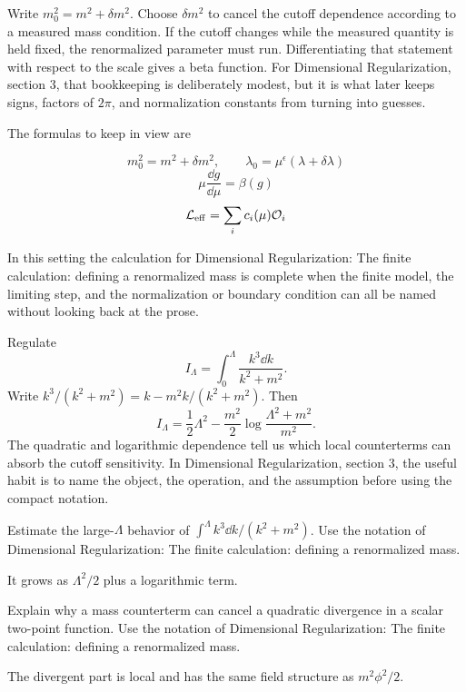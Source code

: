 Write \(m_0^2=m^2+\delta m^2\).  Choose \(\delta m^2\) to cancel the cutoff dependence according to a measured mass condition.  If the cutoff changes while the measured quantity is held fixed, the renormalized parameter must run.  Differentiating that statement with respect to the scale gives a beta function.  For Dimensional Regularization, section 3, that bookkeeping is deliberately modest, but it is what later keeps signs, factors of \(2\pi\), and normalization constants from turning into guesses.

The formulas to keep in view are

\[
  m_0^2=m^2+\delta m^2,\qquad \lambda_0=\mu^\epsilon(\lambda+\delta\lambda)
\]
\[
  \mu\frac{\dd g}{\dd\mu}=\beta(g)
\]
\[
  \mathcal L_{\mathrm{eff}}=\sum_i c_i(\mu)\mathcal O_i
\]

In this setting the calculation for Dimensional Regularization: The finite calculation: defining a renormalized mass is complete when the finite model, the limiting step, and the normalization or boundary condition can all be named without looking back at the prose.




\begin{example}
Regulate
\[
  I_\Lambda=\int_0^\Lambda\frac{k^3\dd k}{k^2+m^2}.
\]
Write \(k^3/(k^2+m^2)=k-m^2k/(k^2+m^2)\).  Then
\[
  I_\Lambda=\frac12\Lambda^2-\frac{m^2}{2}\log\frac{\Lambda^2+m^2}{m^2}.
\]
The quadratic and logarithmic dependence tell us which local counterterms can absorb the cutoff sensitivity.  In Dimensional Regularization, section 3, the useful habit is to name the object, the operation, and the assumption before using the compact notation.
\end{example}



\begin{exercise}
Estimate the large-\(\Lambda\) behavior of \(\int^\Lambda k^3\dd k/(k^2+m^2)\).  Use the notation of Dimensional Regularization: The finite calculation: defining a renormalized mass.
\begin{answer}
It grows as \(\Lambda^2/2\) plus a logarithmic term.
\end{answer}
\end{exercise}

\begin{exercise}
Explain why a mass counterterm can cancel a quadratic divergence in a scalar two-point function.  Use the notation of Dimensional Regularization: The finite calculation: defining a renormalized mass.
\begin{answer}
The divergent part is local and has the same field structure as \(m^2\phi^2/2\).
\end{answer}
\end{exercise}



